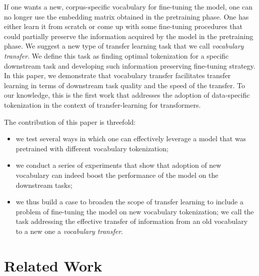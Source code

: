 \documentclass[review]{elsarticle}
\begin{document}
If one wants a new, corpus-specific vocabulary for fine-tuning the model, one can no longer use the embedding matrix obtained in the pretraining phase. One has either learn it from scratch or come up with some fine-tuning procedures that could partially preserve the information acquired by the model in the pretraining phase. We suggest a new type of transfer learning task that we call {\em vocabulary transfer}. We define this task as finding optimal tokenization for a specific downstream task and developing such information preserving fine-tuning strategy. In this paper, we demonstrate that vocabulary transfer facilitates transfer learning in terms of downstream task quality and the speed of the transfer. To our knowledge, this is the first work that addresses the adoption of data-specific tokenization in the context of transfer-learning for transformers.

The contribution of this paper is threefold:
\begin{itemize}
\item we test several ways in which one can effectively leverage a model that was pretrained with different vocabulary tokenization;
\item we conduct a series of experiments that show that adoption of new vocabulary can indeed boost the performance of the model on the downstream tasks;
\item we thus build a case to broaden the scope of transfer learning to include a problem of fine-tuning the model on new vocabulary tokenization; we call the task addressing the effective transfer of information from an old vocabulary to a new one a {\em vocabulary transfer}.
\end{itemize}


\section{Related Work}
\end{document}
